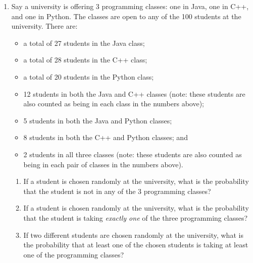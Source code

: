 \documentclass[12pt]{article}
\renewcommand{\(}{\left(}
\renewcommand{\)}{\right)}
\theoremstyle{definition}
\newtheorem*{answer}{Answer}
\begin{document}
\begin{enumerate}
\begin{shaded}
\begin{answer}
            \ Number of arrangements where they are not together, \[= 56 - 6\] \[= 50\]

            \ Now, total number of arrangements if 3 bird and 3 reptile species based on this criterion will be, \[= 50 * 20\] \[= 1000 \ ways \] \\

        c) When 1 particular bird species and 1 particular reptile species cannot be placed together \\ \\
            \ Number of arrangements where they are together, \[= C(7,2) * C(5,2)\] \[= 210\]
            \ Number of arrangements where they are not together, \[= 1120 - 210\] \[= 910\]

    \end{answer}
    \end{shaded}
    \newpage


\item Say a university is offering 3 programming classes: one in Java, one in C++, and one in Python.  The classes are open to any of the 100 students at the university.  There are:
    \begin{itemize}[leftmargin=.5in]
    \item a total of 27 students in the Java class;
    \item a total of 28 students in the C++ class;
    \item a total of 20 students in the Python class;
    \item 12 students in both the Java and C++ classes (note: these students are also counted as being in each class in the numbers above);
    \item 5 students in both the Java and Python classes;
    \item 8 students in both the C++ and Python classes; and
    \item 2 students in all three classes (note: these students are also counted as being in each pair of classes in the numbers above).
    \end{itemize}

    \begin{enumerate}[label=\alph*.]

    \item If a student is chosen randomly at the university, what is the probability that the student is not in any of the 3 programming classes?
    \item If a student is chosen randomly at the university, what is the probability that the student is taking \emph{exactly one} of the three programming classes?
    \item If two different students are chosen randomly at the university, what is the probability that at least one of the chosen students is taking at least one of the programming classes?


\end{enumerate}
\end{enumerate}
\end{document}
